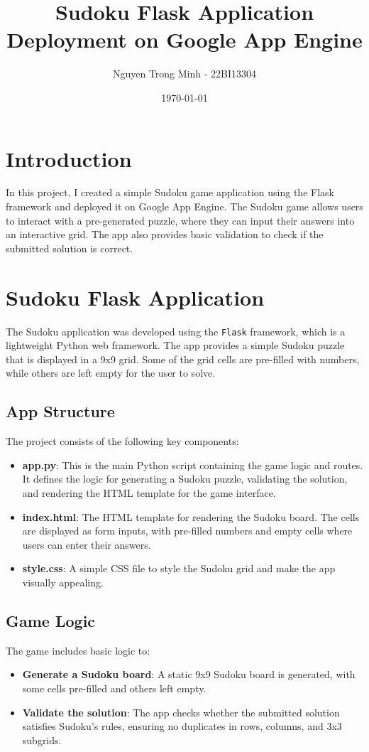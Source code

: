 \documentclass[12pt]{article}
\title{Sudoku Flask Application Deployment on Google App Engine}
\author{Nguyen Trong Minh - 22BI13304}
\date{\today}
\begin{document}
\maketitle

\section{Introduction}

In this project, I created a simple Sudoku game application using the Flask framework and deployed it on Google App Engine. The Sudoku game allows users to interact with a pre-generated puzzle, where they can input their answers into an interactive grid. The app also provides basic validation to check if the submitted solution is correct.

\section{Sudoku Flask Application}

The Sudoku application was developed using the \texttt{Flask} framework, which is a lightweight Python web framework. The app provides a simple Sudoku puzzle that is displayed in a 9x9 grid. Some of the grid cells are pre-filled with numbers, while others are left empty for the user to solve.

\subsection{App Structure}
The project consists of the following key components:
\begin{itemize}
    \item \textbf{app.py}: This is the main Python script containing the game logic and routes. It defines the logic for generating a Sudoku puzzle, validating the solution, and rendering the HTML template for the game interface.
    \item \textbf{index.html}: The HTML template for rendering the Sudoku board. The cells are displayed as form inputs, with pre-filled numbers and empty cells where users can enter their answers.
    \item \textbf{style.css}: A simple CSS file to style the Sudoku grid and make the app visually appealing.
\end{itemize}

\subsection{Game Logic}
The game includes basic logic to:
\begin{itemize}
    \item \textbf{Generate a Sudoku board}: A static 9x9 Sudoku board is generated, with some cells pre-filled and others left empty.
    \item \textbf{Validate the solution}: The app checks whether the submitted solution satisfies Sudoku's rules, ensuring no duplicates in rows, columns, and 3x3 subgrids.
\end{itemize}
\end{document}
